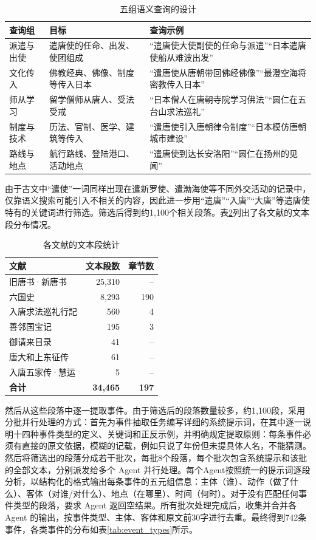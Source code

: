 \documentclass[12pt,a4paper]{article}
\begin{document}
\begin{table}[H]
\centering
\caption{五组语义查询的设计}
\label{tab:queries}
\begin{tabular}{p{2.5cm}p{3.5cm}p{6cm}}
\toprule
\textbf{查询组} & \textbf{目标} & \textbf{查询示例} \\
\midrule
派遣与出使 & 遣唐使的任命、出发、使团组成 & “遣唐使大使副使的任命与派遣”“日本遣唐使船从难波出发” \\
文化传入 & 佛教经典、佛像、制度等传入日本 & “遣唐使从唐朝带回佛经佛像”“最澄空海将密教传入日本” \\
师从学习 & 留学僧师从唐人、受法受戒 & “日本僧人在唐朝寺院学习佛法”“圆仁在五台山求法巡礼” \\
制度与技术 & 历法、官制、医学、建筑等传入 & “遣唐使引入唐朝律令制度”“日本模仿唐朝城市建设” \\
路线与地点 & 航行路线、登陆港口、活动地点 & “遣唐使到达长安洛阳”“圆仁在扬州的见闻” \\
\bottomrule
\end{tabular}
\end{table}

由于古文中“遣使”一词同样出现在遣新罗使、遣渤海使等不同外交活动的记录中，仅靠语义搜索可能引入不相关的内容，因此进一步用“遣唐”“入唐”“大唐”等遣唐使特有的关键词进行筛选。筛选后得到约1,100个相关段落。表\ref{tab:sources}列出了各文献的文本段分布情况。

\begin{table}[H]
\centering
\caption{各文献的文本段统计}
\label{tab:sources}
\begin{tabular}{lrr}
\toprule
\textbf{文献} & \textbf{文本段数} & \textbf{章节数} \\
\midrule
旧唐书·新唐书 & 25,310 & -- \\
六国史 & 8,293 & 190 \\
入唐求法巡礼行記 & 560 & 4 \\
善邻国宝记 & 195 & 3 \\
御请来目录 & 41 & -- \\
唐大和上东征传 & 61 & -- \\
入唐五家传·慧运 & 5 & -- \\
\midrule
\textbf{合计} & \textbf{34,465} & \textbf{197} \\
\bottomrule
\end{tabular}
\end{table}

然后从这些段落中逐一提取事件。由于筛选后的段落数量较多，约1,100段，采用分批并行处理的方式：首先为事件抽取任务编写详细的系统提示词，在其中逐一说明十四种事件类型的定义、关键词和正反示例，并明确规定提取原则：每条事件必须有直接的原文依据，模糊的记载，例如只说了年份但未提具体人名，不能猜测。然后将筛选出的段落分成若干批次，每批8个段落，每个批次包含系统提示和该批的全部文本，分别派发给多个 Agent 并行处理。每个Agent按照统一的提示词逐段分析，以结构化的格式输出每条事件的五元组信息：主体（谁）、动作（做了什么）、客体（对谁/对什么）、地点（在哪里）、时间（何时）。对于没有匹配任何事件类型的段落，要求 Agent 返回空结果。所有批次处理完成后，收集并合并各 Agent 的输出，按事件类型、主体、客体和原文前30字进行去重。最终得到742条事件，各类事件的分布如表\ref{tab:event_types}所示。
\end{document}
